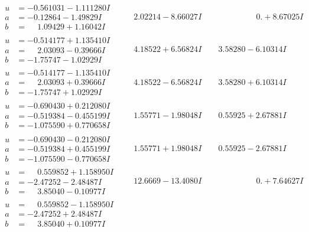 \documentclass[1p]{elsarticle_modified}
\theoremstyle{definition}
\begin{document}
$$\begin{array}{c|c|c}
\begin{aligned}
u &= -0.561031 - 1.111280 I \\
a &= -0.12864 - 1.49829 I \\
b &= \phantom{-}1.09429 + 1.16042 I\end{aligned}
 & \phantom{-}2.02214 - 8.66027 I & \phantom{-0.000000 -}0. + 8.67025 I \\ \hline\begin{aligned}
u &= -0.514177 + 1.135410 I \\
a &= \phantom{-}2.03093 - 0.39666 I \\
b &= -1.75747 - 1.02929 I\end{aligned}
 & \phantom{-}4.18522 + 6.56824 I & \phantom{-}3.58280 - 6.10314 I \\ \hline\begin{aligned}
u &= -0.514177 - 1.135410 I \\
a &= \phantom{-}2.03093 + 0.39666 I \\
b &= -1.75747 + 1.02929 I\end{aligned}
 & \phantom{-}4.18522 - 6.56824 I & \phantom{-}3.58280 + 6.10314 I \\ \hline\begin{aligned}
u &= -0.690430 + 0.212080 I \\
a &= -0.519384 - 0.455199 I \\
b &= -1.075590 + 0.770658 I\end{aligned}
 & \phantom{-}1.55771 - 1.98048 I & \phantom{-}0.55925 + 2.67881 I \\ \hline\begin{aligned}
u &= -0.690430 - 0.212080 I \\
a &= -0.519384 + 0.455199 I \\
b &= -1.075590 - 0.770658 I\end{aligned}
 & \phantom{-}1.55771 + 1.98048 I & \phantom{-}0.55925 - 2.67881 I \\ \hline\begin{aligned}
u &= \phantom{-}0.559852 + 1.158950 I \\
a &= -2.47252 - 2.48487 I \\
b &= \phantom{-}3.85040 - 0.10977 I\end{aligned}
 & \phantom{-}12.6669 - 13.4080 I & \phantom{-0.000000 -}0. + 7.64627 I \\ \hline\begin{aligned}
u &= \phantom{-}0.559852 - 1.158950 I \\
a &= -2.47252 + 2.48487 I \\
b &= \phantom{-}3.85040 + 0.10977 I\end{aligned}

\end{array}$$
\end{document}
